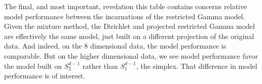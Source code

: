 The final, and most important, revelation this table contains concerns relative model performance
  between the incarnations of the restricted Gamma model.  Given the mixture method, the Dirichlet
  and projected restricted Gamma model are effectively the same model, just built on a different
  projection of the original data.  And indeed, on the 8 dimensional data, the model performance is
  comparable.  But on the higher dimensional data, we see model performance favor the model built on
  $S_{2}^{d-1}$ rather than $S_1^{d-1}$, the simplex.  That difference in model performance is of
  interest.

